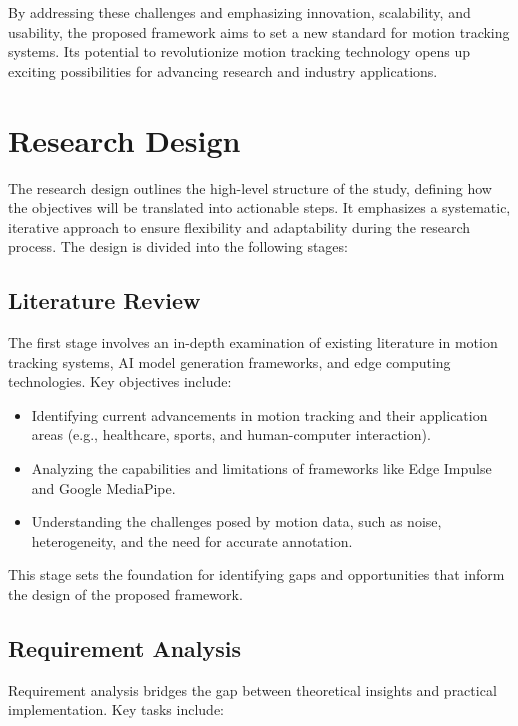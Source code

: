 By addressing these challenges and emphasizing innovation, scalability, and usability, the proposed framework aims to set a new standard for motion tracking systems. Its potential to revolutionize motion tracking technology opens up exciting possibilities for advancing research and industry applications.

\section{Research Design}
The research design outlines the high-level structure of the study, defining how the objectives will be translated into actionable steps. It emphasizes a systematic, iterative approach to ensure flexibility and adaptability during the research process. The design is divided into the following stages:

\subsection{Literature Review}
The first stage involves an in-depth examination of existing literature in motion tracking systems, AI model generation frameworks, and edge computing technologies. Key objectives include:

\begin{itemize}
    \item Identifying current advancements in motion tracking and their application areas (e.g., healthcare, sports, and human-computer interaction).
    \item Analyzing the capabilities and limitations of frameworks like Edge Impulse and Google MediaPipe.
    \item Understanding the challenges posed by motion data, such as noise, heterogeneity, and the need for accurate annotation.
\end{itemize}
This stage sets the foundation for identifying gaps and opportunities that inform the design of the proposed framework.

\subsection{Requirement Analysis}
Requirement analysis bridges the gap between theoretical insights and practical implementation. Key tasks include:

